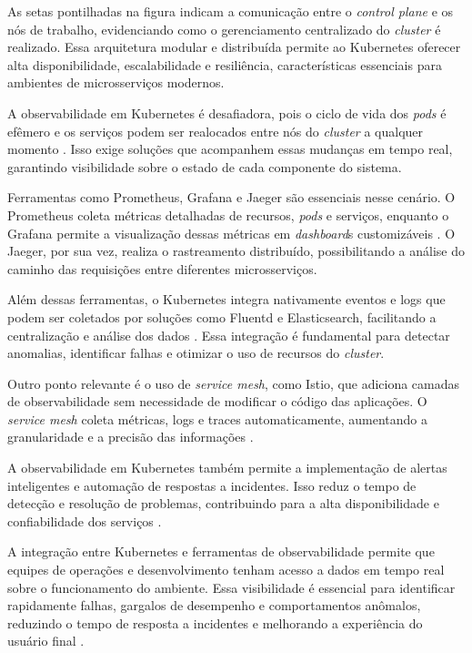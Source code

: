 As setas pontilhadas na figura indicam a comunicação entre o \textit{control plane} e os nós de trabalho, evidenciando como o gerenciamento centralizado do \textit{cluster} é realizado. Essa arquitetura modular e distribuída permite ao Kubernetes oferecer alta disponibilidade, escalabilidade e resiliência, características essenciais para ambientes de microsserviços modernos.

A observabilidade em Kubernetes é desafiadora, pois o ciclo de vida dos \textit{pods} é efêmero e os serviços podem ser realocados entre nós do \textit{cluster} a qualquer momento \cite{ahmed2022observability}. Isso exige soluções que acompanhem essas mudanças em tempo real, garantindo visibilidade sobre o estado de cada componente do sistema.

Ferramentas como Prometheus, Grafana e Jaeger são essenciais nesse cenário. O Prometheus coleta métricas detalhadas de recursos, \textit{pods} e serviços, enquanto o Grafana permite a visualização dessas métricas em \textit{dashboard}s customizáveis \cite{ahmed2022observability}. O Jaeger, por sua vez, realiza o rastreamento distribuído, possibilitando a análise do caminho das requisições entre diferentes microsserviços.

Além dessas ferramentas, o Kubernetes integra nativamente eventos e logs que podem ser coletados por soluções como Fluentd e Elasticsearch, facilitando a centralização e análise dos dados \cite{ahmed2022observability}. Essa integração é fundamental para detectar anomalias, identificar falhas e otimizar o uso de recursos do \textit{cluster}.

Outro ponto relevante é o uso de \textit{service mesh}, como Istio, que adiciona camadas de observabilidade sem necessidade de modificar o código das aplicações. O \textit{service mesh} coleta métricas, logs e traces automaticamente, aumentando a granularidade e a precisão das informações \cite{kim2021servicemesh}.

A observabilidade em Kubernetes também permite a implementação de alertas inteligentes e automação de respostas a incidentes. Isso reduz o tempo de detecção e resolução de problemas, contribuindo para a alta disponibilidade e confiabilidade dos serviços \cite{ahmed2022observability}.

A integração entre Kubernetes e ferramentas de observabilidade permite que equipes de operações e desenvolvimento tenham acesso a dados em tempo real sobre o funcionamento do ambiente. Essa visibilidade é essencial para identificar rapidamente falhas, gargalos de desempenho e comportamentos anômalos, reduzindo o tempo de resposta a incidentes e melhorando a experiência do usuário final \cite{ahmed2022observability}.

